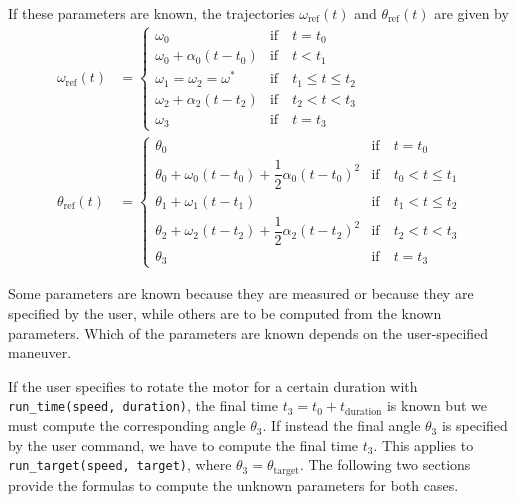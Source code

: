 \documentclass[12pt, a4paper]
{article}
\providecommand{\sub}[1]{_{\text{#1}}}
\providecommand{\w}{\omega}
\providecommand{\wt}{\w^*}
\providecommand{\wref}{\w\sub{ref}}
\renewcommand{\th}{\theta}
\providecommand{\thref}{\th\sub{ref}}
\renewcommand{\a}{\alpha}
\providecommand{\w}{\omega}
\begin{document}
If these parameters are known, the trajectories $\wref(t)$ and $\thref(t)$ are
given by
%
\begin{align}
    \label{eq:wref}
    \wref(t)&=
    \begin{cases}
    \w_0 & \text{if} \quad t = t_0\\ 
    \w_0 + \a_0(t-t_0) & \text{if} \quad t < t_1\\
    \w_1=\w_2=\wt  & \text{if} \quad t_1 \leq t \leq t_2\\
    \w_2 + \a_2(t-t_2) & \text{if}\quad t_2 < t < t_3\\
    \w_3 & \text{if} \quad t = t_3
    \end{cases}\\[1em]
    \label{eq:thref}
    \thref(t)&=
    \begin{cases}
        \th_0 & \text{if} \quad t = t_0\\
        \th_0 + \w_0(t-t_0) + \dfrac{1}{2}\a_0(t-t_0)^2 &
            \text{if} \quad t_0 < t \leq t_1\\
        \th_1 + \w_1(t-t_1)  & \text{if} \quad t_1 < t \leq t_2\\
        \th_2 +\w_2(t-t_2)+\dfrac{1}{2}\a_2(t-t_2)^2 &
            \text{if}\quad t_2 < t < t_3\\
        \th_3 & \text{if} \quad t = t_3
    \end{cases}
\end{align}

Some parameters are known because they are measured or because they are
specified by the user, while others are to be computed from the known
parameters. Which of the parameters are known depends on the user-specified
maneuver.

If the user specifies to rotate the motor for a certain duration with
\texttt{run\_time(speed, duration)}, the final time $t_3=t_0+t\sub{duration}$
is known but we must compute the corresponding angle $\th_3$. If instead the
final angle $\th_3$ is specified by the user command, we have to compute the
final time $t_3$. This applies to \texttt{run\_target(speed, target)}, where
$\th_3=\th\sub{target}$. The following two sections provide the formulas to
compute the unknown parameters for both cases.
\end{document}
